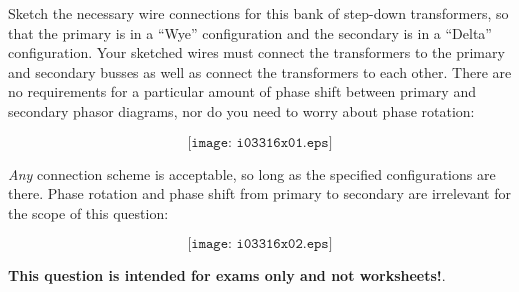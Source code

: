 

Sketch the necessary wire connections for this bank of step-down transformers, so that the primary is in a ``Wye'' configuration and the secondary is in a ``Delta'' configuration.  Your sketched wires must connect the transformers to the primary and secondary busses as well as connect the transformers to each other.  There are no requirements for a particular amount of phase shift between primary and secondary phasor diagrams, nor do you need to worry about phase rotation:

$$\texttt{[image: i03316x01.eps]}$$







{\it Any} connection scheme is acceptable, so long as the specified configurations are there.  Phase rotation and phase shift from primary to secondary are irrelevant for the scope of this question:

$$\texttt{[image: i03316x02.eps]}$$







{\bf This question is intended for exams only and not worksheets!}.



